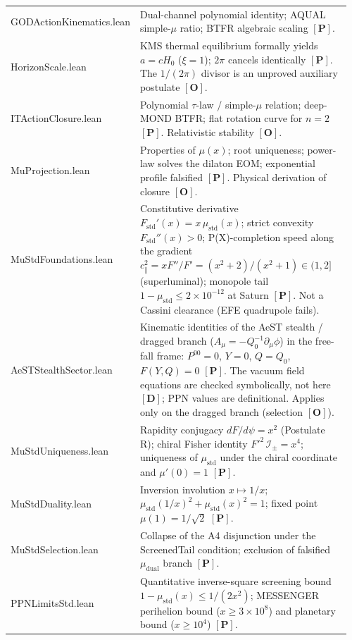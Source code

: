 \documentclass[aps,prd,preprint,superscriptaddress,nofootinbib,amsmath,amssymb,floatfix]{revtex4-2}
\makeatletter
\DeclareRobustCommand{\rntexttt}[1]{%
  \ifmmode
    \nfss@text{\ttfamily\hyphenchar\font=-1 #1}%
  \else
    \hmode@bgroup\ttfamily\hyphenchar\font=-1 #1\egroup
  \fi}
\DeclareRobustCommand{\_}{%
    \ifmmode\nfss@text{\textunderscore}\else\textunderscore\penalty\z@\fi}%
\let\texttt\rntexttt
\makeatother
\begin{document}
\begin{longtable}{@{}>{\raggedright\arraybackslash}p{0.34\linewidth}>{\raggedright\arraybackslash}p{0.62\linewidth}@{}}
\texttt{GODActionKinematics.lean} & Dual-channel polynomial identity; AQUAL simple-$\mu$ ratio; BTFR algebraic scaling $\mathbf{[P]}$. \\
\texttt{HorizonScale.lean} & KMS thermal equilibrium formally yields $a = cH_0$ ($\xi = 1$); $2\pi$ cancels identically $\mathbf{[P]}$. The $1/(2\pi)$ divisor is an unproved auxiliary postulate $\mathbf{[O]}$. \\
\texttt{ITActionClosure.lean} & Polynomial $\tau$-law / simple-$\mu$ relation; deep-MOND BTFR; flat rotation curve for $n=2$ $\mathbf{[P]}$. Relativistic stability $\mathbf{[O]}$. \\
\texttt{MuProjection.lean} & Properties of $\mu(x)$; root uniqueness; power-law solves the dilaton EOM; exponential profile falsified $\mathbf{[P]}$. Physical derivation of closure $\mathbf{[O]}$. \\
\texttt{MuStdFoundations.lean} & Constitutive derivative $F_{\text{std}}'(x) = x\,\mu_{\text{std}}(x)$; strict convexity $F_{\text{std}}''(x) > 0$; P(X)-completion speed along the gradient $c_\parallel^2 = xF''/F' = (x^2+2)/(x^2+1) \in (1,2]$ (superluminal); monopole tail $1-\mu_{\text{std}} \le 2\times10^{-12}$ at Saturn $\mathbf{[P]}$. Not a Cassini clearance (EFE quadrupole fails). \\
\texttt{AeSTStealthSector.lean} & Kinematic identities of the AeST stealth / dragged branch ($A_\mu = -Q_0^{-1}\partial_\mu\phi$) in the free-fall frame: $P^{00} = 0$, $Y = 0$, $Q = Q_0$, $F(Y,Q) = 0$ $\mathbf{[P]}$. The vacuum field equations are checked symbolically, not here $\mathbf{[D]}$; PPN values are definitional. Applies only on the dragged branch (selection $\mathbf{[O]}$). \\
\texttt{MuStdUniqueness.lean} & Rapidity conjugacy $dF/d\psi = x^2$ (Postulate R); chiral Fisher identity $F'^2\,\mathcal{I}_\pm = x^4$; uniqueness of $\mu_{\text{std}}$ under the chiral coordinate and $\mu'(0)=1$ $\mathbf{[P]}$. \\
\texttt{MuStdDuality.lean} & Inversion involution $x \mapsto 1/x$; $\mu_{\text{std}}(1/x)^2 + \mu_{\text{std}}(x)^2 = 1$; fixed point $\mu(1) = 1/\sqrt{2}$ $\mathbf{[P]}$. \\
\texttt{MuStdSelection.lean} & Collapse of the A4 disjunction under the \texttt{ScreenedTail} condition; exclusion of falsified $\mu_{\text{dual}}$ branch $\mathbf{[P]}$. \\
\texttt{PPNLimitsStd.lean} & Quantitative inverse-square screening bound $1 - \mu_{\text{std}}(x) \le 1/(2x^2)$; MESSENGER perihelion bound ($x \ge 3\times 10^8$) and planetary bound ($x \ge 10^4$) $\mathbf{[P]}$. \\

\end{longtable}
\end{document}
